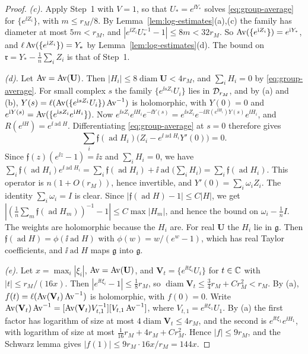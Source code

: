 \begin{proof}
\emph{(c).} Apply Step~1 with $V=1$, so that $U_*=e^{\ii Y_*}$ solves \eqref{eq:group-average} for $\{e^{\ii Z_i}\}$, with $m\le r_M/8$. By Lemma~\ref{lem:log-estimates}(a),(c) the family has diameter at most $5m<r_M$, and $|e^{\ii Z_i}U_*^{-1}-1|\le8m<32r_M$. So $\operatorname{Av}(\{e^{\mathrm i Z_i}\})=e^{\mathrm i Y_*}$, and $\ell \operatorname{Av}(\{e^{\mathrm i Z_i}\})=Y_*$ by Lemma~\ref{lem:log-estimates}(d). The bound on $\mathfrak r=Y_*-\frac1n\sum_iZ_i$ is that of Step~1.

\emph{(d).} Let $\operatorname{Av}=\operatorname{Av}(\mathbf U)$. Then $|H_i|\le8\operatorname{diam}\mathbf U<4r_M$, and $\sum_iH_i=0$ by \eqref{eq:group-average}. For small complex $s$ the family $\{e^{\ii sZ_i}U_i\}$ lies in $\mathcal D_{r_M}$, and by (a) and (b), $Y(s)=\ell(\operatorname{Av}(\{e^{\mathrm i sZ_i}U_i\})\operatorname{Av}^{-1})$ is holomorphic, with $Y(0)=0$ and $e^{\mathrm i Y(s)}=\operatorname{Av}(\{e^{\mathrm i sZ_i}e^{\mathrm i H_i}\})$. Now $e^{\ii sZ_i}e^{\ii H_i}e^{-\ii Y(s)}=e^{\ii sZ_i}e^{-\ii R(e^{\ii H_i})Y(s)}e^{\ii H_i}$, and $R(e^{\ii H})=e^{\ii\operatorname{ad}H}$. Differentiating \eqref{eq:group-average} at $s=0$ therefore gives
\[
\sum_i\mathfrak f(\operatorname{ad}H_i)\big(Z_i-e^{\ii\operatorname{ad}H_i}Y'(0)\big)=0 .
\]
Since $\mathfrak f(z)(e^{\ii z}-1)=\ii z$ and $\sum_iH_i=0$, we have $\sum_i\mathfrak f(\operatorname{ad}H_i)e^{\ii\operatorname{ad}H_i}=\sum_i\mathfrak f(\operatorname{ad}H_i)+\ii\operatorname{ad}\big(\sum_iH_i\big)=\sum_i\mathfrak f(\operatorname{ad}H_i)$. This operator is $n(1+O(r_M))$, hence invertible, and $Y'(0)=\sum_i\omega_iZ_i$. The identity $\sum_i\omega_i=I$ is clear. Since $|\mathfrak f(\operatorname{ad}H)-1|\le C|H|$, we get $|(\frac1n\sum_m\mathfrak f(\operatorname{ad}H_m))^{-1}-1|\le C\max|H_m|$, and hence the bound on $\omega_i-\frac1nI$. The weights are holomorphic because the $H_i$ are. For real $\mathbf U$ the $H_i$ lie in $\mathfrak g$. Then $\mathfrak f(\operatorname{ad}H)=\phi(\ii\operatorname{ad}H)$ with $\phi(w)=w/(e^w-1)$, which has real Taylor coefficients, and $\ii\operatorname{ad}H$ maps $\mathfrak g$ into $\mathfrak g$.

\emph{(e).} Let $x=\max_i|\xi_i|$, $\operatorname{Av}=\operatorname{Av}(\mathbf U)$, and $\mathbf V_t=\{e^{\ii t\xi_i}U_i\}$ for $t\in\mathbb C$ with $|t|\le r_M/(16x)$. Then $|e^{\ii t\xi_i}-1|\le\frac18r_M$, so $\operatorname{diam}\mathbf V_t\le\frac34r_M+Cr_M^2<r_M$. By (a), $f(t)=\ell(\operatorname{Av}(\mathbf V_t)\operatorname{Av}^{-1})$ is holomorphic, with $f(0)=0$. Write $\operatorname{Av}(\mathbf V_t)\operatorname{Av}^{-1}=[\operatorname{Av}(\mathbf V_t)V_{t,1}^{-1}][V_{t,1}\operatorname{Av}^{-1}]$, where $V_{t,1}=e^{\ii t\xi_1}U_1$. By (a) the first factor has logarithm of size at most $4\operatorname{diam}\mathbf V_t\le4r_M$, and the second is $e^{\ii t\xi_1}e^{\ii H_1}$, with logarithm of size at most $\frac1{16}r_M+4r_M+Cr_M^2$. Hence $|f|\le9r_M$, and the Schwarz lemma gives $|f(1)|\le9r_M\cdot16x/r_M=144x$.
\end{proof}

